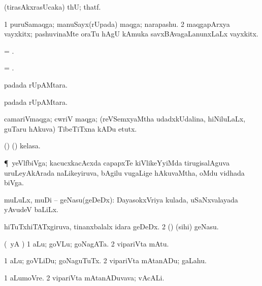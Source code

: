 \bentry
{} 
\gl{\BAavayx} 
\bmng
(tirasAkxrasUcaka) thU; thatf.
\emng
\eentry

\bentry
{} 
\gl{\nA} 
\bmng
\bnum
\num{1} puruSamaqga; manuSayx(rUpada) maqga; narapashu. 
\num{2} maqgapArxya vayxkitx; pashuvinaMte oraTu hAgU kAmuka savxBAvagaLanunxLaLx vayxkitx.
\enum
\emng   
\eentry

\bentry
{} 
\gl{\nA}
\bmng
= .
\emng
\eentry

\bentry
{} 
\gl{\nA}
\bmng
= .
\emng
\eentry

\bentry
{} 
\gl{\nA} 
\bmng
{} padada rUpAMtara.
\emng 
\eentry

\bentry
{} 
\gl{\nA}
\bmng
{} padada rUpAMtara.
\emng 
\eentry

\bentry
{} 
\gl{\nA}
\bmng
camariVmaqga; cwriV maqga; (reVSemxyaMtha udadxkUdalina, hiNiluLaLx, guTaru hAkuva) TibeTiTxna kADu etutx. \quad {}
\emng
\eentry

\bentry
{} 
\gl{\nA}
\bmng
(\AseTxrXV) (\ashi) kelasa.
\emng
\eentry

\bentry
{} 
\gl{\nA} 
\bmng
\P\ yeVlfbiVga; kacucxkacAcxda capapxTe kiVlikeYyiMda tirugisalAguva uruLeyAkArada naLikeyiruva, bAgilu \mo vugaLige hAkuvaMtha, oMdu vidhada biVga.  
\emng
\eentry

\bentry
{} 
\gl{\nA} 
\bmng
\bnum
{} muLuLx,  muDi -- geNasu(geDeDx): 
\banum
{} DayasokxVriya kulada, uSaNxvalayada yAvudeV baLiLx. 

 hiTuTxhiTATxgiruva, tinanxbalalx idara geDeDx. 
\eanum
\numie
\num{2} (\ame) (sihi) geNasu.
\enum
\emng
\eentry

\bentry
{} 
\gl{\nA}  
\bmng
(\AmA\ yA \pArxM) 
\bnum
\num{1} aLu; goVLu; goNagATa. 
\num{2} vipariVta mAtu.
\enum
\emng
\eentry

\bentry
{} 
\gl{\akirx} 
\bmng
\bnum
\num{1} aLu; goVLiDu; goNaguTuTx. 
\num{2} vipariVta mAtanADu; gaLahu.
\enum
\emng 
\eentry

\bentry
{} 
\gl{\nA} 
\bmng
\bnum
\num{1} aLumoVre. 
\num{2} vipariVta mAtanADuvava; vAcALi.
\enum
\emng
\eentry

